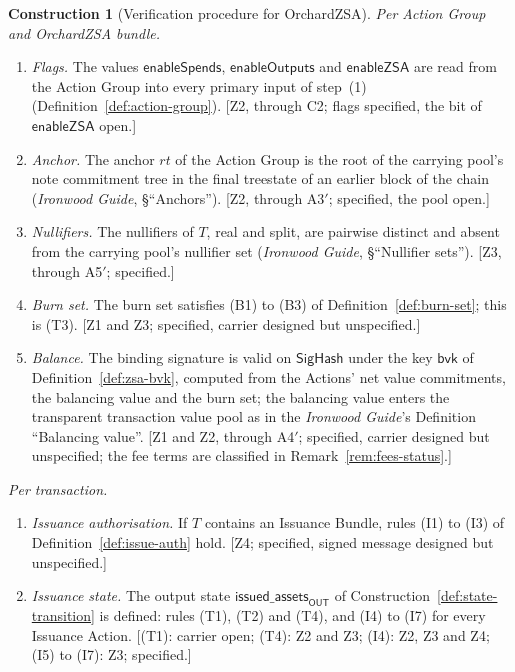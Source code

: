 \documentclass[11pt,a4paper]{article}
\theoremstyle{definition}
\newtheorem{construction}[theorem]{Construction}
\begin{document}
\begin{construction}[Verification procedure for OrchardZSA]
\emph{Per Action Group and OrchardZSA bundle.}
\begin{enumerate}[label=(\arabic*), leftmargin=2.4em, resume]
\item \emph{Flags.} The values $\mathsf{enableSpends}$,
  $\mathsf{enableOutputs}$ and $\mathsf{enableZSA}$ are read from the Action
  Group into every primary input of step~(1)
  (Definition~\ref{def:action-group}). [Z2, through C2; flags specified,
  the bit of $\mathsf{enableZSA}$ open.]
\item \emph{Anchor.} The anchor $\mathit{rt}$ of the Action Group is the root
  of the carrying pool's note commitment tree in the final treestate of an
  earlier block of the chain (\emph{Ironwood Guide}, \S``Anchors''). [Z2,
  through A3$'$; specified, the pool open.]
\item \emph{Nullifiers.} The nullifiers of $T$, real and split, are pairwise
  distinct and absent from the carrying pool's nullifier set
  (\emph{Ironwood Guide}, \S``Nullifier sets''). [Z3, through A5$'$;
  specified.]
\item \emph{Burn set.} The burn set satisfies (B1) to (B3) of
  Definition~\ref{def:burn-set}; this is (T3). [Z1 and Z3; specified,
  carrier designed but unspecified.]
\item \emph{Balance.} The binding signature is valid on $\mathsf{SigHash}$
  under the key $\mathsf{bvk}$ of Definition~\ref{def:zsa-bvk}, computed from
  the Actions' net value commitments, the balancing value and the burn set;
  the balancing value enters the transparent transaction value pool as in the
  \emph{Ironwood Guide}'s Definition ``Balancing value''. [Z1 and Z2,
  through A4$'$; specified, carrier designed but unspecified; the fee terms
  are classified in Remark~\ref{rem:fees-status}.]
\end{enumerate}

\emph{Per transaction.}
\begin{enumerate}[label=(\arabic*), leftmargin=2.4em, resume]
\item \emph{Issuance authorisation.} If $T$ contains an Issuance Bundle,
  rules (I1) to (I3) of Definition~\ref{def:issue-auth} hold. [Z4;
  specified, signed message designed but unspecified.]
\item \emph{Issuance state.} The output state
  $\mathsf{issued\_assets}_{\mathsf{OUT}}$ of
  Construction~\ref{def:state-transition} is defined: rules (T1), (T2) and
  (T4), and (I4) to (I7) for every Issuance Action. [(T1): carrier open;
  (T4): Z2 and Z3; (I4): Z2, Z3 and Z4; (I5) to (I7): Z3; specified.]
\end{enumerate}


\end{construction}
\end{document}
